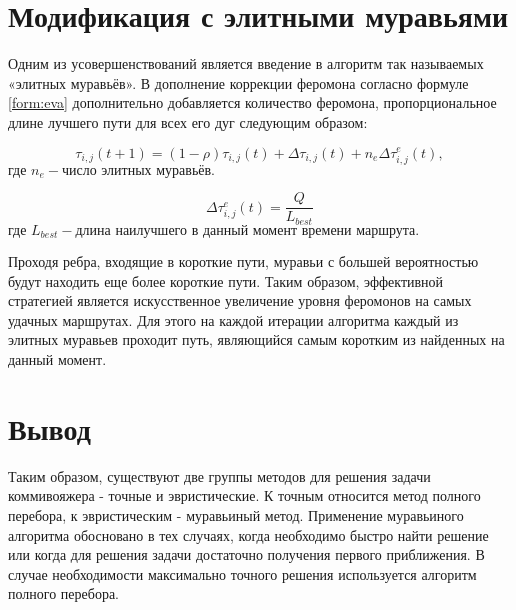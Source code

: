 \section{Модификация с элитными муравьями}
Одним из усовершенствований является введение в алгоритм так называемых «элитных муравьёв». 
В дополнение коррекции феромона согласно формуле \eqref{form:eva} дополнительно добавляется количество феромона, пропорциональное длине лучшего пути для всех его дуг следующим образом:

\begin{equation}
	\tau _{i,j}(t+1)=(1-\rho )\tau _{i,j}(t)+\Delta \tau _{i,j}(t)+n_e\Delta \tau _{i,j}^e(t),
\end{equation}
$
\text{где } n_e - \text{число элитных муравьёв.}
$

\begin{equation}
	\Delta \tau _{i,j}^e(t)=\frac{Q}{L_{best}}
\end{equation}
$
\text{где } L_{best} - \text{длина наилучшего в данный момент времени маршрута}.
$

Проходя ребра, входящие в короткие пути, муравьи с большей вероятностью будут находить еще более короткие пути. 
Таким образом, эффективной стратегией является искусственное увеличение уровня феромонов на самых удачных маршрутах. 
Для этого на каждой итерации алгоритма каждый из элитных муравьев проходит путь, являющийся самым коротким из найденных на данный момент.

\section*{Вывод}
Таким образом, существуют две группы методов для решения задачи коммивояжера - точные и эвристические. 
К точным относится метод полного перебора, к эвристическим - муравьиный метод.
Применение муравьиного алгоритма обосновано в тех случаях, когда необходимо быстро найти решение или когда для решения задачи достаточно получения первого приближения. 
В случае необходимости максимально точного решения используется алгоритм полного перебора.

